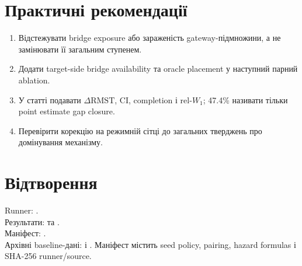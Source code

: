 \documentclass[11pt,a4paper]{article}
\begin{document}
\section{Практичні рекомендації}\label{sec:recommendations}

\begin{enumerate}
  \item Відстежувати bridge exposure або зараженість gateway-підмножини,
  а не замінювати її загальним ступенем.
  \item Додати target-side bridge availability та oracle placement у наступний
  парний ablation.
  \item У статті подавати $\Delta\mathrm{RMST}$, CI, completion і rel-$W_1$;
  47.4\% називати тільки point estimate gap closure.
  \item Перевірити корекцію на режимній сітці до загальних тверджень про
  домінування механізму.
\end{enumerate}

\section{Відтворення}\label{sec:reproduction}

Runner: . \\
Результати: 
та . \\
Маніфест: . \\
Архівні baseline-дані: 
і .
Маніфест містить seed policy, pairing, hazard formulas і SHA-256 runner/source.
\end{document}
